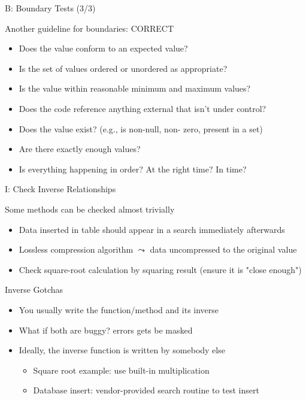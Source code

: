 \begin{frame}{B: Boundary Tests (3/3)}
  \begin{block}{Another guideline for boundaries: CORRECT}
    \begin{itemize}
    \item {} Does the value conform to an expected
      value?
    \item {} Is the set of values ordered or unordered as
      appropriate?
    \item {} Is the value within reasonable minimum and maximum
      values?
    \item {} Does the code reference anything external that
      isn't under control? %
    \item {} Does the value exist? (e.g., is non-null, non-
      zero, present in a set)
    \item {} Are there exactly enough values?
    \item {} Is everything happening in order? At the right
      time? In time?
    \end{itemize}
  \end{block}
\end{frame}
\begin{frame}{I: Check Inverse Relationships}
  \begin{block}{Some methods can be checked almost trivially}
    \begin{itemize}
    \item Data inserted in table should appear in a search immediately
      afterwards
    \item Lossless compression algorithm $\leadsto$ data uncompressed to the original value
    \item Check square-root calculation by squaring result (ensure it is "close
      enough")
    \end{itemize}
  \end{block}

  \begin{block}{Inverse Gotchas}
    \begin{itemize}
    \item You usually write the function/method and its inverse
    \item What if both are buggy? errors gets be masked
    \item Ideally, the inverse function is written by somebody else
      \begin{itemize}
      \item Square root example: use built-in multiplication
      \item Database insert: vendor-provided search routine to test insert
      \end{itemize}
    \end{itemize}
  \end{block}
\end{frame}
